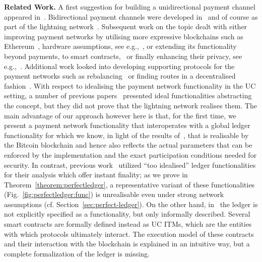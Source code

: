 \noindent \textbf{Related Work.} A first suggestion for building a
unidirectional payment channel appeared in~\cite{spilman}. Bidirectional payment
channels were developed in~\cite{DBLP:conf/sss/DeckerW15} and of course as part
of the lightning network~\cite{lightning}. Subsequent work on the topic dealt
with either improving payment networks by utilising more expressive blockchains
such as Ethereum~\cite{perun}, hardware assumptions, see
e.g.,~\cite{DBLP:conf/systor/LindNEKPS18}, or extending its functionality beyond
payments, to smart contracts,~\cite{sprites} or finally enhancing their privacy,
see
e.g.,~\cite{Malavolta:2017:CPP:3133956.3134096,DBLP:conf/ccs/0001M17,DBLP:conf/ndss/HeilmanABSG17}.
Additional work looked into developing supporting protocols for the payment
networks such as rebalancing~\cite{DBLP:conf/ccs/KhalilG17} or finding routes in
a decentralised fashion~\cite{flare,spider}. With respect to idealising the
payment network functionality in the UC setting, a number of previous
papers~\cite{DBLP:conf/ccs/DziembowskiFH18,Malavolta:2017:CPP:3133956.3134096,sprites,perun}
presented ideal functionalities abstracting the concept, but they did not prove
that the lightning network realises them. The main advantage of our approach
however here is that, for the first time, we present a payment network
functionality that interoperates with a global ledger functionality for which we
know, in light of the results of~\cite{BMTZ17}, that is realisable by the
Bitcoin blockchain and hence also reflects the actual parameters that can be
enforced by the implementation and the exact participation conditions needed for
security. In contrast, previous
work~\cite{DBLP:conf/ccs/DziembowskiFH18,Malavolta:2017:CPP:3133956.3134096,perun}
utilized ``too idealised'' ledger functionalities for their analysis which offer
instant finality; as we prove in Theorem~\ref{theorem:perfectledger}, a
representative variant of these functionalities
(Fig.~\ref{fig:perfectledger:func}) is unrealisable even under strong network
assumptions (cf. Section~\ref{sec:perfect-ledger}). On the other hand,
in~\cite{sprites} the ledger is not explicitly specified as a functionality, but
only informally described. Several smart contracts are formally defined instead
as UC ITMs, which are the entities with which protocols ultimately interact. The
execution model of these contracts and their interaction with the blockchain is
explained in an intuitive way, but a complete formalization of the ledger is
missing.

